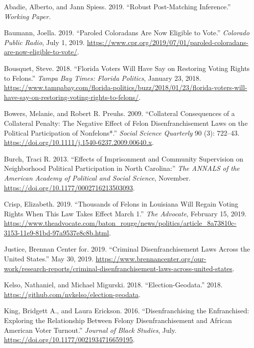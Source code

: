 \documentclass[
  12pt,
]{article}
\newlength{\cslhangindent}
\newenvironment{cslreferences}%
  {\setlength{\parindent}{0pt}%
  \everypar{\setlength{\hangindent}{\cslhangindent}}\ignorespaces}%
  {\par}
\begin{document}
\hypertarget{refs}{}
\begin{cslreferences}
\leavevmode\hypertarget{ref-Abadie2019}{}%
Abadie, Alberto, and Jann Spiess. 2019. ``Robust Post-Matching Inference.'' \emph{Working Paper.}

\leavevmode\hypertarget{ref-Baumann2019}{}%
Baumann, Joella. 2019. ``Paroled Coloradans Are Now Eligible to Vote.'' \emph{Colorado Public Radio}, July 1, 2019. \url{https://www.cpr.org/2019/07/01/paroled-coloradans-are-now-eligible-to-vote/}.

\leavevmode\hypertarget{ref-Bousquet2018}{}%
Bousquet, Steve. 2018. ``Florida Voters Will Have Say on Restoring Voting Rights to Felons.'' \emph{Tampa Bay Times: Florida Politics}, January 23, 2018. \url{https://www.tampabay.com/florida-politics/buzz/2018/01/23/florida-voters-will-have-say-on-restoring-voting-rights-to-felons/}.

\leavevmode\hypertarget{ref-Bowers2009}{}%
Bowers, Melanie, and Robert R. Preuhs. 2009. ``Collateral Consequences of a Collateral Penalty: The Negative Effect of Felon Disenfranchisement Laws on the Political Participation of Nonfelons*.'' \emph{Social Science Quarterly} 90 (3): 722--43. \url{https://doi.org/10.1111/j.1540-6237.2009.00640.x}.

\leavevmode\hypertarget{ref-Burch2013}{}%
Burch, Traci R. 2013. ``Effects of Imprisonment and Community Supervision on Neighborhood Political Participation in North Carolina:'' \emph{The ANNALS of the American Academy of Political and Social Science}, November. \url{https://doi.org/10.1177/0002716213503093}.

\leavevmode\hypertarget{ref-Crisp2019}{}%
Crisp, Elizabeth. 2019. ``Thousands of Felons in Louisiana Will Regain Voting Rights When This Law Takes Effect March 1.'' \emph{The Advocate}, February 15, 2019. \url{https://www.theadvocate.com/baton_rouge/news/politics/article_8a73810c-3153-11e9-81bd-97a9537e8c8b.html}.

\leavevmode\hypertarget{ref-bcj_laws}{}%
Justice, Brennan Center for. 2019. ``Criminal Disenfranchisement Laws Across the United States.'' May 30, 2019. \url{https://www.brennancenter.org/our-work/research-reports/criminal-disenfranchisement-laws-across-united-states}.

\leavevmode\hypertarget{ref-Kelso2018}{}%
Kelso, Nathaniel, and Michael Migurski. 2018. ``Election-Geodata.'' 2018. \url{https://github.com/nvkelso/election-geodata}.

\leavevmode\hypertarget{ref-King2016}{}%
King, Bridgett A., and Laura Erickson. 2016. ``Disenfranchising the Enfranchised: Exploring the Relationship Between Felony Disenfranchisement and African American Voter Turnout.'' \emph{Journal of Black Studies}, July. \url{https://doi.org/10.1177/0021934716659195}.


\end{cslreferences}
\end{document}
